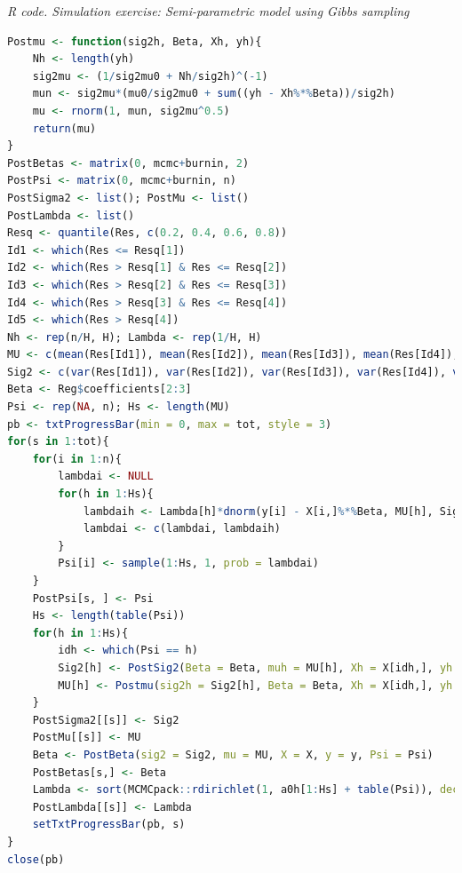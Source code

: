 \begin{tcolorbox}[enhanced,width=4.67in,center upper,
	fontupper=\large\bfseries,drop shadow southwest,sharp corners]
	\textit{R code. Simulation exercise: Semi-parametric model using Gibbs sampling}
	\begin{VF}
		\begin{lstlisting}[language=R]
Postmu <- function(sig2h, Beta, Xh, yh){
	Nh <- length(yh)
	sig2mu <- (1/sig2mu0 + Nh/sig2h)^(-1)
	mun <- sig2mu*(mu0/sig2mu0 + sum((yh - Xh%*%Beta))/sig2h)
	mu <- rnorm(1, mun, sig2mu^0.5)
	return(mu)
}
PostBetas <- matrix(0, mcmc+burnin, 2)
PostPsi <- matrix(0, mcmc+burnin, n)
PostSigma2 <- list(); PostMu <- list()
PostLambda <- list()
Resq <- quantile(Res, c(0.2, 0.4, 0.6, 0.8))
Id1 <- which(Res <= Resq[1])
Id2 <- which(Res > Resq[1] & Res <= Resq[2])
Id3 <- which(Res > Resq[2] & Res <= Resq[3])
Id4 <- which(Res > Resq[3] & Res <= Resq[4])
Id5 <- which(Res > Resq[4])
Nh <- rep(n/H, H); Lambda <- rep(1/H, H)
MU <- c(mean(Res[Id1]), mean(Res[Id2]), mean(Res[Id3]), mean(Res[Id4]), mean(Res[Id5]))
Sig2 <- c(var(Res[Id1]), var(Res[Id2]), var(Res[Id3]), var(Res[Id4]), var(Res[Id5]))
Beta <- Reg$coefficients[2:3]
Psi <- rep(NA, n); Hs <- length(MU)
pb <- txtProgressBar(min = 0, max = tot, style = 3)
for(s in 1:tot){
	for(i in 1:n){
		lambdai <- NULL
		for(h in 1:Hs){
			lambdaih <- Lambda[h]*dnorm(y[i] - X[i,]%*%Beta, MU[h], Sig2[h]^0.5)
			lambdai <- c(lambdai, lambdaih)
		}
		Psi[i] <- sample(1:Hs, 1, prob = lambdai)
	}
	PostPsi[s, ] <- Psi
	Hs <- length(table(Psi))
	for(h in 1:Hs){
		idh <- which(Psi == h)
		Sig2[h] <- PostSig2(Beta = Beta, muh = MU[h], Xh = X[idh,], yh = y[idh])
		MU[h] <- Postmu(sig2h = Sig2[h], Beta = Beta, Xh = X[idh,], yh = y[idh])
	}
	PostSigma2[[s]] <- Sig2
	PostMu[[s]] <- MU 
	Beta <- PostBeta(sig2 = Sig2, mu = MU, X = X, y = y, Psi = Psi)
	PostBetas[s,] <- Beta
	Lambda <- sort(MCMCpack::rdirichlet(1, a0h[1:Hs] + table(Psi)), decreasing = TRUE)
	PostLambda[[s]] <- Lambda
	setTxtProgressBar(pb, s)
}
close(pb)
\end{lstlisting}
	\end{VF}
\end{tcolorbox}

